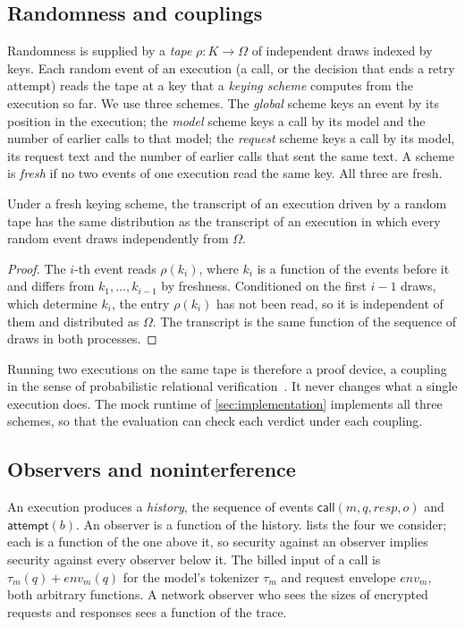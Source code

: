 \subsection{Randomness and couplings}\label{sec:couplings}

Randomness is supplied by a \emph{tape} $\rho : K \to \Omega$ of independent draws
indexed by keys. Each random event of an execution (a call, or the decision that
ends a retry attempt) reads the tape at a key that a \emph{keying scheme} computes
from the execution so far. We use three schemes. The \emph{global} scheme keys an
event by its position in the execution; the \emph{model} scheme keys a call by
its model and the number of earlier calls to that model; the \emph{request}
scheme keys a call by its model, its request text and the number of earlier calls
that sent the same text. A scheme is \emph{fresh} if no two events of one
execution read the same key. All three are fresh.

\begin{lemma}\label{lem:coupling}
Under a fresh keying scheme, the transcript of an execution driven by a random tape
has the same distribution as the transcript of an execution in which every random
event draws independently from $\Omega$.
\end{lemma}

\begin{proof}
The $i$-th event reads $\rho(k_i)$, where $k_i$ is a function of the events before
it and differs from $k_1, \dots, k_{i-1}$ by freshness. Conditioned on the first
$i-1$ draws, which determine $k_i$, the entry $\rho(k_i)$ has not been read, so it
is independent of them and distributed as $\Omega$. The transcript is the same
function of the sequence of draws in both processes.
\end{proof}

Running two executions on the same tape is therefore a proof device, a coupling in
the sense of probabilistic relational verification~\cite{barthe2009formal,barthe2017coupling}.
It never changes what a single execution does. The mock runtime of
\cref{sec:implementation} implements all three schemes, so that the evaluation can
check each verdict under each coupling.

\subsection{Observers and noninterference}\label{sec:observers}

An execution produces a \emph{history}, the sequence of events
$\mathsf{call}(m, q, \mathit{resp}, o)$ and $\mathsf{attempt}(b)$. An observer is a
function of the history.  lists the four we consider; each is a
function of the one above it, so security against an observer implies security
against every observer below it. The billed input of a call is
$\tau_m(q) + \mathit{env}_m(q)$ for the model's tokenizer $\tau_m$ and request
envelope $\mathit{env}_m$, both arbitrary functions. A network observer who sees the
sizes of encrypted requests and responses sees a function of the trace.


